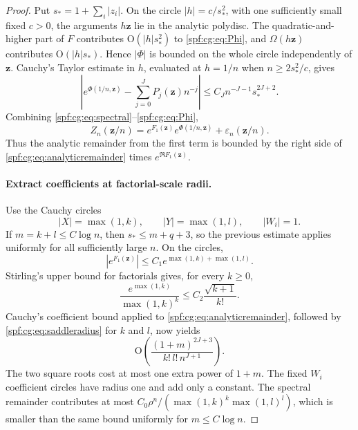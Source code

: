 \documentclass[11pt]{article}
\numberwithin{equation}{section}
\theoremstyle{definition}
\theoremstyle{remark}
\theoremstyle{definition}
\newcommand{\bigO}{\mathrm O}
\begin{document}
\begin{proof}
Put $s_*=1+\sum_i|z_i|$. On the circle $|h|=c/s_*^2$, with one sufficiently
small fixed $c>0$, the arguments $h\boldsymbol z$ lie in the analytic
polydisc. The quadratic-and-higher part of $F$ contributes $\bigO(|h|s_*^2)$
to \eqref{spf:cg:eq:Phi}, and $\Omega(h\boldsymbol z)$ contributes
$\bigO(|h|s_*)$. Hence $|\Phi|$ is bounded on the whole circle independently
of $\boldsymbol z$. Cauchy's Taylor estimate in $h$, evaluated at $h=1/n$
when $n\ge2s_*^2/c$, gives
\begin{equation}
 \left|e^{\Phi(1/n,\boldsymbol z)}-\sum_{j=0}^{J}P_j(\boldsymbol z)n^{-j}\right|
 \le C_Jn^{-J-1}s_*^{2J+2}.
 \label{spf:cg:eq:analyticremainder}
\end{equation}
Combining \eqref{spf:cg:eq:spectral}--\eqref{spf:cg:eq:Phi},
\[
 Z_n(\boldsymbol z/n)=e^{F_1(\boldsymbol z)}e^{\Phi(1/n,\boldsymbol z)}+\varepsilon_n(\boldsymbol z/n).
\]
Thus the analytic remainder from the first term is bounded by the right
side of \eqref{spf:cg:eq:analyticremainder} times
$e^{\Re F_1(\boldsymbol z)}$.

\paragraph{Extract coefficients at factorial-scale radii.}
Use the Cauchy circles
\[
 |X|=\max(1,k),\qquad |Y|=\max(1,l),\qquad |W_i|=1.
\]
If $m=k+l\le C\log n$, then $s_*\le m+q+3$, so the previous estimate
applies uniformly for all sufficiently large $n$. On the circles,
\[
 |e^{F_1(\boldsymbol z)}|\le C_1e^{\max(1,k)+\max(1,l)}.
\]
Stirling's upper bound for factorials gives, for every $k\ge0$,
\begin{equation}
 \frac{e^{\max(1,k)}}{\max(1,k)^k}
       \le C_2\frac{\sqrt{k+1}}{k!}.
 \label{spf:cg:eq:saddleradius}
\end{equation}
Cauchy's coefficient bound applied to \eqref{spf:cg:eq:analyticremainder},
followed by \eqref{spf:cg:eq:saddleradius} for $k$ and $l$, now yields
\[
 \bigO\!\left(\frac{(1+m)^{2J+3}}{k!\,l!\,n^{J+1}}\right).
\]
The two square roots cost at most one extra power of $1+m$. The fixed
$W_i$ coefficient circles have radius one and add only a constant. The
spectral remainder contributes at most
$C_0\rho^n/(\max(1,k)^k\max(1,l)^l)$, which is smaller than the same bound
uniformly for $m\le C\log n$.


\end{proof}
\end{document}
